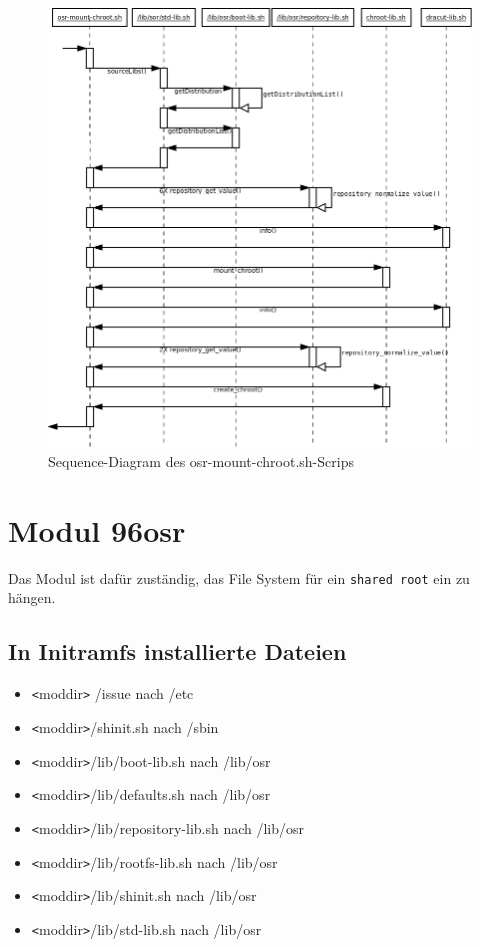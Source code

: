 \documentclass[10pt,a4paper]{article}
\begin{document}
\begin{figure}[H]
 \centering
 \includegraphics[width=1.0\textwidth,height=1.0\textwidth]{./sequence_diagram_osr-mount-chroot_DE_de.png}
 \caption[]{Sequence-Diagram des osr-mount-chroot.sh-Scrips}
\end{figure}



\section{Modul 96osr}

Das Modul ist dafür zuständig, das File System für ein \texttt{shared root} ein zu hängen.

\subsection{In Initramfs installierte Dateien}

\begin{itemize}
 \item \verb|<|moddir\verb|>| /issue nach /etc
 \item \verb|<|moddir\verb|>|/shinit.sh nach /sbin
 \item \verb|<|moddir\verb|>|/lib/boot-lib.sh nach /lib/osr
 \item \verb|<|moddir\verb|>|/lib/defaults.sh nach /lib/osr
 \item \verb|<|moddir\verb|>|/lib/repository-lib.sh nach /lib/osr
 \item \verb|<|moddir\verb|>|/lib/rootfs-lib.sh nach /lib/osr
 \item \verb|<|moddir\verb|>|/lib/shinit.sh nach /lib/osr
 \item \verb|<|moddir\verb|>|/lib/std-lib.sh nach /lib/osr
\end{itemize}
\end{document}

